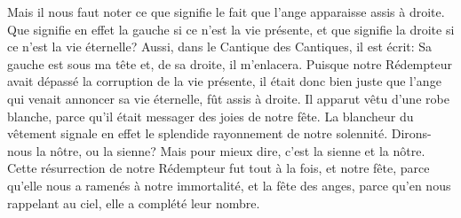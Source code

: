 Mais il nous faut noter
	ce que signifie le fait que l’ange apparaisse assis à droite.
Que signifie en effet la gauche si ce n’est la vie présente,
	et que signifie la droite si ce n’est la vie éternelle?
Aussi, dans le Cantique des Cantiques, il est écrit:
	Sa gauche est sous ma tête et, de sa droite, il m’enlacera.
Puisque notre Rédempteur avait dépassé la corruption de la vie présente,
	il était donc bien juste que l’ange qui venait annoncer sa vie éternelle,
	fût assis à droite.
Il apparut vêtu d’une robe blanche,
	parce qu’il était messager des joies de notre fête.
La blancheur du vêtement signale en effet
		le splendide rayonnement de notre solennité.
Dirons-nous la nôtre, ou la sienne?
	Mais pour mieux dire, c’est la sienne et la nôtre.
Cette résurrection de notre Rédempteur fut tout à la fois,
	et notre fête, parce qu’elle nous a ramenés à notre immortalité,
	et la fête des anges, parce qu’en nous rappelant au ciel,
		elle a complété leur nombre.
